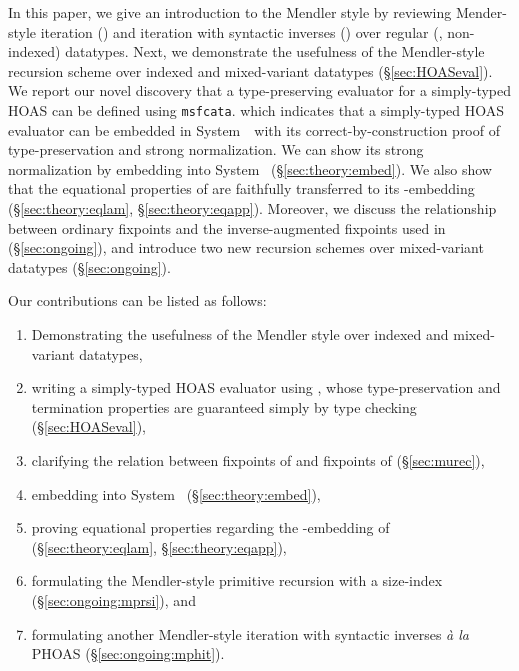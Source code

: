 In this paper, we give an introduction to the Mendler style by reviewing
Mender-style iteration (\MIt{}) and iteration with syntactic inverses (\msfit{})
over regular (\ie, non-indexed) datatypes. Next, we demonstrate the usefulness
of the Mendler-style recursion scheme \msfit{} over indexed and mixed-variant
datatypes (\S\ref{sec:HOASeval}). We report our novel discovery that
a type-preserving evaluator for a simply-typed HOAS can be defined
using \lstinline{msfcata}. which indicates that a simply-typed HOAS evaluator
can be embedded in System~\Fw\ with its correct-by-construction proof of
type-preservation and strong normalization. We can show its strong normalization
by embedding \msfit{} into System \Fw\ (\S\ref{sec:theory:embed}). We also show
that the equational properties of \msfit{} are faithfully transferred to its
\Fw-embedding (\S\ref{sec:theory:eqlam}, \S\ref{sec:theory:eqapp}).
Moreover, we discuss the relationship between ordinary fixpoints and
the inverse-augmented fixpoints used in \msfit{} (\S\ref{sec:ongoing}),
and introduce two new recursion schemes over mixed-variant datatypes
(\S\ref{sec:ongoing}).

Our contributions can be listed as follows:
\begin{enumerate}
\item Demonstrating the usefulness of the Mendler style
	over indexed and mixed-variant datatypes,
\item writing a simply-typed HOAS evaluator using \msfit{},
	whose type-preservation and termination properties are guaranteed
	simply by type checking (\S\ref{sec:HOASeval}),
\item clarifying the relation between
	fixpoints of \MIt{} and fixpoints of \msfit{} (\S\ref{sec:murec}),
\item embedding \msfit{} into System \Fw\ (\S\ref{sec:theory:embed}),
\item proving equational properties regarding the \Fw-embedding of \msfit{} 
	(\S\ref{sec:theory:eqlam}, \S\ref{sec:theory:eqapp}),
\item formulating the Mendler-style primitive recursion with a size-index %
	(\S\ref{sec:ongoing:mprsi}), and
\item formulating another Mendler-style iteration with syntactic inverses
	\textit{\`a la} PHOAS (\S\ref{sec:ongoing:mphit}).
\end{enumerate}
